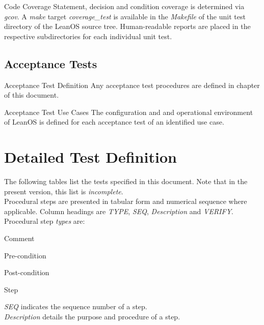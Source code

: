 {Code Coverage}{%
Statement, decision and condition coverage is determined via \emph{gcov}.
A \emph{make} target \emph{coverage\_test} is available in the \emph{Makefile}
of the unit test directory of the LeanOS source tree.
Human-readable reports are placed in the respective subdirectories for each
individual unit test.
}%
{}{}


\section{Acceptance Tests}

{Acceptance Test Definition}{%
Any acceptance test procedures are defined in chapter
\mbox{} of this document.
}%
{}{}

{Acceptance Test Use Cases}{%
The configuration and and operational environment of LeanOS is defined for each
acceptance test of an identified use case.
}%
{}{}


\chapter{Detailed Test Definition}
\label{detailedtestdefinitions}

The following tables list the tests specified in this document. Note that in
the present version, this list is \emph{incomplete}.\\

\noindent
Procedural steps are presented in tabular form and numerical sequence where
applicable. Column headings are \emph{TYPE}, \emph{SEQ}, \emph{Description}
and \emph{VERIFY}.\\

\noindent
Procedural step \emph{types} are:
\begin{description}[labelwidth=4em,leftmargin=\parindent,labelindent=\parindent]
	\item[\textbf{CMT}]	Comment
	\item[\textbf{PRE}]	Pre-condition
	\item[\textbf{PST}]	Post-condition
	\item[\textbf{STP}]	Step
\end{description}


\noindent
\emph{SEQ} indicates the sequence number of a step.\\

\noindent
\emph{Description} details the purpose and procedure of a step. \\

